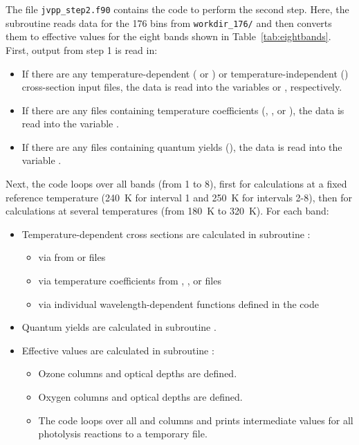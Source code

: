 \documentclass[a4paper,twoside]{article}
\def\nosep{\setlength\parsep{0mm}\setlength\topsep{0mm}\setlength\itemsep{0mm}}
\begin{document}
The file \verb|jvpp_step2.f90| contains the code to perform the second
step. Here, the subroutine  reads data for the 176
bins from \verb|workdir_176/| and then converts them to effective values
for the eight bands shown in Table~\ref{tab:eightbands}. First, output
from step 1 is read in:
\begin{itemize}
\item If there are any temperature-dependent ( or
  ) or temperature-independent () cross-section
  input files, the data is read into the variables  or
  , respectively.
\item If there are any files containing temperature coefficients
  (, , or ), the data is read into
  the variable .
\item If there are any files containing quantum yields (),
  the data is read into the variable .
\end{itemize}
Next, the code loops over all bands (from 1 to 8), first for
calculations at a fixed reference temperature (240~\unit{K} for interval
1 and 250~\unit{K} for intervals 2-8), then for calculations at several
temperatures (from 180~\unit{K} to 320~\unit{K}). For each band:
\begin{itemize}\nosep
\item Temperature-dependent cross sections  are calculated
  in subroutine :
  \begin{itemize}\nosep
  \item via  from  or  files
  \item via temperature coefficients  from ,
    , or  files
  \item via individual wavelength-dependent functions defined in the
    code
  \end{itemize}
\item Quantum yields are calculated in subroutine .
\item Effective values are calculated in subroutine :
  \begin{itemize}\nosep
  \item Ozone columns and optical depths  are defined.
  \item Oxygen columns and optical depths  are defined.
  \item The code loops over all  and  columns and
    prints intermediate values for all photolysis reactions to a
    temporary file.
  \end{itemize}
\end{itemize}
\end{document}
